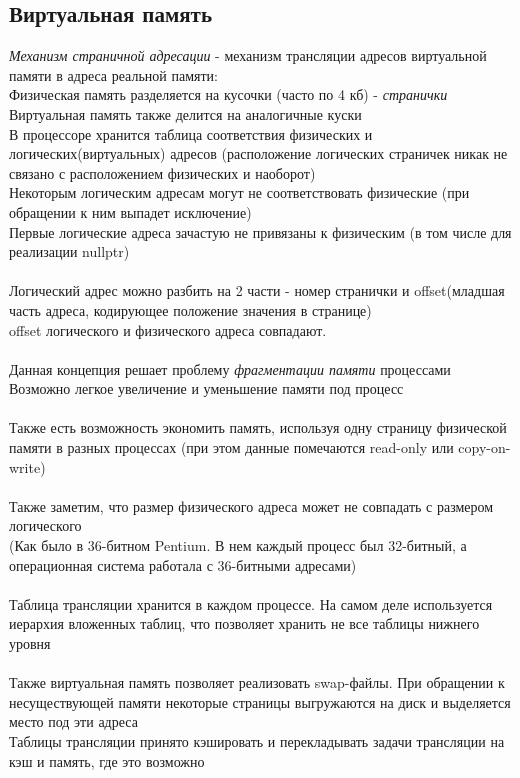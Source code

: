 \documentclass[12pt]{article}
\begin{document}
\subsection{Виртуальная память}
\textit{Механизм страничной адресации} - механизм трансляции адресов виртуальной памяти в адреса реальной памяти:\\
Физическая память разделяется на кусочки (часто по 4 кб) - \textit{странички}\\
Виртуальная память также делится на аналогичные куски\\
В процессоре хранится таблица соответствия физических и логических(виртуальных) адресов (расположение логических страничек никак не связано с расположением физических и наоборот)\\
Некоторым логическим адресам могут не соответствовать физические (при обращении к ним выпадет исключение)\\
Первые логические адреса зачастую не привязаны к физическим (в том числе для реализации nullptr)\\\\
Логический адрес можно разбить на 2 части - номер странички и offset(младшая часть адреса, кодирующее положение значения в странице)\\
offset логического и физического адреса совпадают.\\\\
Данная концепция решает проблему \textit{фрагментации памяти} процессами\\
Возможно легкое увеличение и уменьшение памяти под процесс\\\\
Также есть возможность экономить память, используя одну страницу физической памяти в разных процессах (при этом данные помечаются read-only или copy-on-write)\\\\
Также заметим, что размер физического адреса может не совпадать с размером логического\\
(Как было в 36-битном Pentium. В нем каждый процесс был 32-битный, а операционная система работала с 36-битными адресами)\\\\
Таблица трансляции хранится в каждом процессе. На самом деле используется иерархия вложенных таблиц, что позволяет хранить не все таблицы нижнего уровня\\\\
Также виртуальная память позволяет реализовать swap-файлы. При обращении к несуществующей памяти некоторые страницы выгружаются на диск и выделяется место под эти адреса\\
Таблицы трансляции принято кэшировать и перекладывать задачи трансляции на кэш и память, где это возможно
\end{document}
